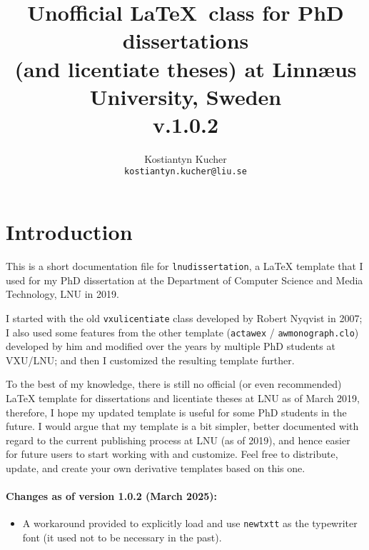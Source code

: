 \documentclass[10pt,a4paper]{article}
\title{Unofficial \LaTeX\ class for PhD dissertations\\(and licentiate theses) at Linn{\ae}us University, Sweden\\v.1.0.2}
\author{Kostiantyn Kucher\\
\texttt{kostiantyn.kucher@liu.se}
}
\begin{document}
\maketitle

\section{Introduction}
This is a short documentation file for \texttt{lnudissertation}, a LaTeX template that I used for my PhD dissertation at the Department of Computer Science and Media Technology, LNU in 2019. 

I started with the old \texttt{vxulicentiate} class developed by Robert Nyqvist in 2007; I also used some features from the other template (\texttt{actawex} / \texttt{awmonograph.clo}) developed by him and modified over the years by multiple PhD students at VXU/LNU; and then I customized the resulting template further. 

To the best of my knowledge, there is still no official (or even recommended) LaTeX template for dissertations and licentiate theses at LNU as of March 2019, therefore, I hope my updated template is useful for some PhD students in the future. 
I would argue that my template is a bit simpler, better documented with regard to the current publishing process at LNU (as of 2019), and hence easier for future users to start working with and customize. 
Feel free to distribute, update, and create your own derivative templates based on this one.

\paragraph{Changes as of version 1.0.2 (March 2025):}
\begin{itemize}
	\item A workaround provided to explicitly load and use \texttt{newtxtt} as the typewriter font (it used not to be necessary in the past).
\end{itemize}
\end{document}
